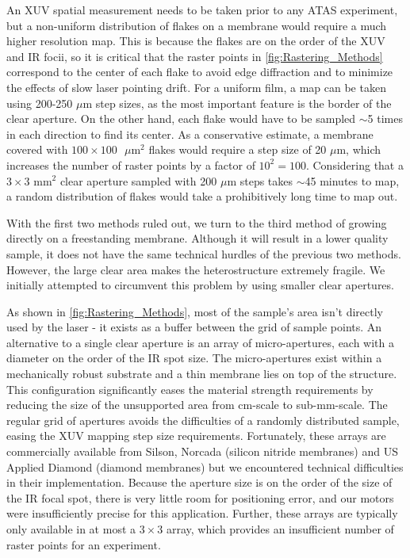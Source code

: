An XUV spatial measurement needs to be taken prior to any ATAS experiment, but a non-uniform distribution of flakes on a membrane would require a much higher resolution map. This is because the flakes are on the order of the XUV and IR focii, so it is critical that the raster points in \cref{fig:Rastering_Methods} correspond to the center of each flake to avoid edge diffraction and to minimize the effects of slow laser pointing drift. For a uniform film, a map can be taken using 200-250 $\mu$m step sizes, as the most important feature is the border of the clear aperture. On the other hand, each flake would have to be sampled $\sim$5 times in each direction to find its center. As a conservative estimate, a membrane covered with $100 \times 100\text{ }\mu$m$^2$ flakes would require a step size of 20 $\mu$m, which increases the number of raster points by a factor of $10^2 = 100$. Considering that a $3 \times 3 \text{ mm}^2$ clear aperture sampled with 200 $\mu$m steps takes $\sim$45 minutes to map, a random distribution of flakes would take a prohibitively long time to map out.

With the first two methods ruled out, we turn to the third method of growing directly on a freestanding membrane. Although it will result in a lower quality sample, it does not have the same technical hurdles of the previous two methods. However, the large clear area makes the heterostructure extremely fragile. We initially attempted to circumvent this problem by using smaller clear apertures.

As shown in \cref{fig:Rastering_Methods}, most of the sample's area isn't directly used by the laser - it exists as a buffer between the grid of sample points. An alternative to a single clear aperture is an array of micro-apertures, each with a diameter on the order of the IR spot size. The micro-apertures exist within a mechanically robust substrate and a thin membrane lies on top of the structure. This configuration significantly eases the material strength requirements by reducing the size of the unsupported area from cm-scale to sub-mm-scale. The regular grid of apertures avoids the difficulties of a randomly distributed sample, easing the XUV mapping step size requirements. Fortunately, these arrays are commercially available from Silson, Norcada (silicon nitride membranes) and US Applied Diamond (diamond membranes) but we encountered technical difficulties in their implementation. Because the aperture size is on the order of the size of the IR focal spot, there is very little room for positioning error, and our motors were insufficiently precise for this application. Further, these arrays are typically only available in at most a $3\times3$ array, which provides an insufficient number of raster points for an experiment.

